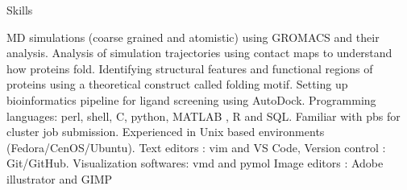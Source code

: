 
\begin{rubric}{Skills}

\entry* MD simulations (coarse grained and atomistic) using GROMACS and their analysis.
\entry*Analysis of simulation trajectories using contact maps to understand how proteins fold.
\entry*Identifying structural features and functional regions of proteins using a theoretical construct called folding motif.
\entry*Setting up bioinformatics pipeline for ligand screening using AutoDock.
\entry*Programming languages: perl, shell, C, python, MATLAB , R and SQL.
\entry*Familiar with pbs for cluster job submission.
\entry*Experienced in Unix based environments (Fedora/CenOS/Ubuntu).
\entry*Text editors : vim and VS Code, Version control : Git/GitHub.
\entry*Visualization softwares: vmd and pymol
\entry*Image editors : Adobe illustrator and GIMP
\end{rubric}
